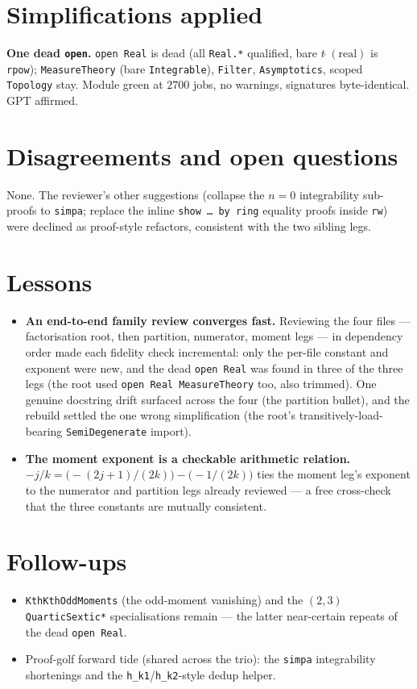 \documentclass[11pt]{article}
\begin{document}
\section{Simplifications applied}
\textbf{One dead \texttt{open}.} \texttt{open Real} is dead (all \texttt{Real.*} qualified, bare
$t\,\hat{}\,(\text{real})$ is \texttt{rpow}); \texttt{MeasureTheory} (bare \texttt{Integrable}),
\texttt{Filter}, \texttt{Asymptotics}, scoped \texttt{Topology} stay. Module green at $2700$ jobs,
no warnings, signatures byte-identical. GPT affirmed.

\section{Disagreements and open questions}
None. The reviewer's other suggestions (collapse the $n=0$ integrability sub-proofs to
\texttt{simpa}; replace the inline \texttt{show \dots\ by ring} equality proofs inside \texttt{rw})
were declined as proof-style refactors, consistent with the two sibling legs.

\section{Lessons}
\begin{itemize}[noitemsep]
  \item \textbf{An end-to-end family review converges fast.} Reviewing the four files
    --- factorisation root, then partition, numerator, moment legs --- in dependency order made
    each fidelity check incremental: only the per-file constant and exponent were new, and the dead
    \texttt{open Real} was found in three of the three legs (the root used \texttt{open Real
    MeasureTheory} too, also trimmed). One genuine docstring drift surfaced across the four
    (the partition bullet), and the rebuild settled the one wrong simplification (the root's
    transitively-load-bearing \texttt{SemiDegenerate} import).
  \item \textbf{The moment exponent is a checkable arithmetic relation.} $-j/k =
    \big(-(2j+1)/(2k)\big)-\big(-1/(2k)\big)$ ties the moment leg's exponent to the numerator and
    partition legs already reviewed --- a free cross-check that the three constants are mutually
    consistent.
\end{itemize}

\section{Follow-ups}
\begin{itemize}[noitemsep]
  \item \texttt{KthKthOddMoments} (the odd-moment vanishing) and the $(2,3)$ \texttt{QuarticSextic*}
    specialisations remain --- the latter near-certain repeats of the dead \texttt{open Real}.
  \item Proof-golf forward tide (shared across the trio): the \texttt{simpa} integrability
    shortenings and the \texttt{h\_k1}/\texttt{h\_k2}-style dedup helper.
\end{itemize}
\end{document}
